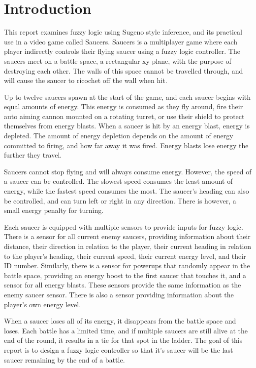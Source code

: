 \section{Introduction}

This report examines fuzzy logic using Sugeno style inference, and its practical use in a video game called Saucers. Saucers is a multiplayer game where each player indirectly controls their flying saucer using a fuzzy logic controller. The saucers meet on a battle space, a rectangular xy plane, with the purpose of destroying each other. The walls of this space cannot be travelled through, and will cause the saucer to ricochet off the wall when hit.

Up to twelve saucers spawn at the start of the game, and each saucer begins with equal amounts of energy. This energy is consumed as they fly around, fire their auto aiming cannon mounted on a rotating turret, or use their shield to protect themselves from energy blasts. When a saucer is hit by an energy blast, energy is depleted. The amount of energy depletion depends on the amount of energy committed to firing, and how far away it was fired. Energy blasts lose energy the further they travel.

Saucers cannot stop flying and will always consume energy. However, the speed of a saucer can be controlled. The slowest speed consumes the least amount of energy, while the fastest speed consumes the most. The saucer's heading can also be controlled, and can turn left or right in any direction. There is however, a small energy penalty for turning.

Each saucer is equipped with multiple sensors to provide inputs for fuzzy logic. There is a sensor for all current enemy saucers, providing information about their distance, their direction in relation to the player, their current heading in relation to the player's heading, their current speed, their current energy level, and their ID number. Similarly, there is a sensor for powerups that randomly appear in the battle space, providing an energy boost to the first saucer that touches it, and a sensor for all energy blasts. These sensors provide the same information as the enemy saucer sensor. There is also a sensor providing information about the player's own energy level.

When a saucer loses all of its energy, it disappears from the battle space and loses. Each battle has a limited time, and if multiple saucers are still alive at the end of the round, it results in a tie for that spot in the ladder. The goal of this report is to design a fuzzy logic controller so that it's saucer will be the last saucer remaining by the end of a battle.